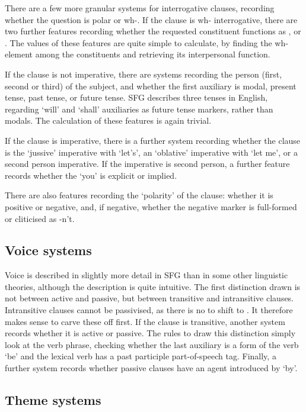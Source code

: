 \documentclass[11pt]{article}
\begin{document}
There are a few more granular systems for interrogative clauses, recording whether the question is polar or wh-. If the clause is wh- interrogative, there are two further features recording whether the requested constituent functions as ,  or . The values of these features are quite simple to calculate, by finding the wh- element among the constituents and retrieving its interpersonal function.

If the clause is not imperative, there are systems recording the person (first, second or third) of the subject, and whether the first auxiliary is modal, present tense, past tense, or future tense. SFG describes three tenses in English, regarding `will' and `shall' auxiliaries as future tense markers, rather than modals. The calculation of these features is again trivial.

If the clause is imperative, there is a further system recording whether the clause is the `jussive' imperative with `let's', an `oblative' imperative with `let me', or a second person imperative. If the imperative is second person, a further feature records whether the `you' is explicit or implied.

There are also features recording the `polarity' of the clause: whether it is positive or negative, and, if negative, whether the negative marker is full-formed or cliticised as -n't.

\subsection{Voice systems}

Voice is described in slightly more detail in SFG than in some other linguistic theories, although the description is quite intuitive. The first distinction drawn is not between active and passive, but between transitive and intransitive clauses. Intransitive clauses cannot be passivised, as there is no  to shift to . It therefore makes sense to carve these off first. If the clause is transitive, another system records whether it is active or passive. The rules to draw this distinction simply look at the verb phrase, checking whether the last auxiliary is a form of the verb `be' and the lexical verb has a past participle part-of-speech tag. Finally, a further system records whether passive clauses have an agent introduced by `by'.

\subsection{Theme systems}
\end{document}

